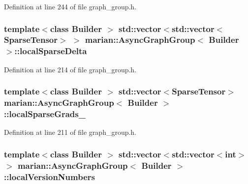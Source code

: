 Definition at line 244 of file graph\+\_\+group.\+h.

\subsubsection[{\texorpdfstring{local\+Sparse\+Delta}{localSparseDelta}}]{\setlength{\rightskip}{0pt plus 5cm}template$<$class Builder $>$ std\+::vector$<$std\+::vector$<${\bf Sparse\+Tensor}$>$ $>$ {\bf marian\+::\+Async\+Graph\+Group}$<$ Builder $>$\+::local\+Sparse\+Delta\hspace{0.3cm}{\ttfamily [private]}}\hypertarget{classmarian_1_1AsyncGraphGroup_aa29abae307772ca69402a19729b2b49d}{}\label{classmarian_1_1AsyncGraphGroup_aa29abae307772ca69402a19729b2b49d}


Definition at line 214 of file graph\+\_\+group.\+h.

\subsubsection[{\texorpdfstring{local\+Sparse\+Grads\+\_\+}{localSparseGrads_}}]{\setlength{\rightskip}{0pt plus 5cm}template$<$class Builder $>$ std\+::vector$<${\bf Sparse\+Tensor}$>$ {\bf marian\+::\+Async\+Graph\+Group}$<$ Builder $>$\+::local\+Sparse\+Grads\+\_\+\hspace{0.3cm}{\ttfamily [private]}}\hypertarget{classmarian_1_1AsyncGraphGroup_a29422f1a8b9a8e2cc732101a34557b61}{}\label{classmarian_1_1AsyncGraphGroup_a29422f1a8b9a8e2cc732101a34557b61}


Definition at line 211 of file graph\+\_\+group.\+h.

\subsubsection[{\texorpdfstring{local\+Version\+Numbers}{localVersionNumbers}}]{\setlength{\rightskip}{0pt plus 5cm}template$<$class Builder $>$ std\+::vector$<$std\+::vector$<$int$>$ $>$ {\bf marian\+::\+Async\+Graph\+Group}$<$ Builder $>$\+::local\+Version\+Numbers\hspace{0.3cm}{\ttfamily [private]}}\hypertarget{classmarian_1_1AsyncGraphGroup_a51752a96c753b4c3b34a4c8c3eec86ba}{}\label{classmarian_1_1AsyncGraphGroup_a51752a96c753b4c3b34a4c8c3eec86ba}


